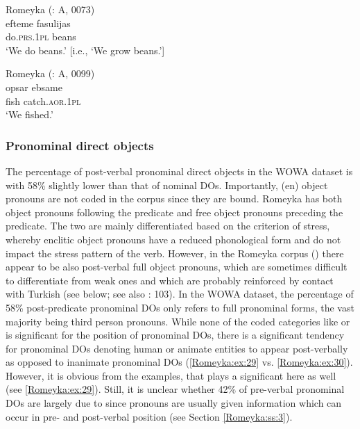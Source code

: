 \documentclass[output=paper,colorlinks,citecolor=brown]{langscibook}
\begin{document}
\ea\label{Romeyka:ex:27}
Romeyka (\citealt{schreiber2021pontic}: A, 0073) \\
\gll efteme fasulijas \\
do\textsc{.prs.1pl} beans \\
\glt `We do beans.' [i.e., `We grow beans.']  \\
\z

\ea\label{Romeyka:ex:28} 	
Romeyka (\citealt{schreiber2021pontic}: A, 0099) \\
\gll opsar ebsame \\
fish catch\textsc{.aor.1pl} \\
\glt `We fished.'
\z

\subsubsection{Pronominal direct objects}\label{Romeyka:ss:4.4.2}

The percentage of post-verbal pronominal direct objects in the WOWA dataset is with 58\% slightly lower than that of nominal DOs. Importantly, (en) object pronouns are not coded in the corpus since they are bound. Romeyka has both  object pronouns following the predicate and free object pronouns preceding the predicate. The two are mainly differentiated based on the criterion of stress, whereby enclitic object pronouns have a reduced phonological form and do not impact the stress pattern of the verb. However, in the Romeyka corpus (\citealt{schreiber_inprep}) there appear to be also post-verbal full object pronouns, which are sometimes difficult to differentiate from weak ones and which are probably reinforced by contact with Turkish (see below; see also \citealt{schreibergrammar2022}: 103). In the WOWA dataset, the percentage of 58\% post-predicate pronominal DOs only refers to full pronominal forms, the vast majority being third person pronouns. While none of the coded categories like  or  is significant for the position of pronominal DOs, there is a significant tendency for pronominal DOs denoting human or animate entities to appear post-verbally as opposed to inanimate pronominal DOs (\ref{Romeyka:ex:29} vs. \ref{Romeyka:ex:30}). However, it is obvious from the examples, that  plays a significant  here as well (see \ref{Romeyka:ex:29}). Still, it is unclear whether 42\% of pre-verbal pronominal DOs are largely due to  since pronouns are usually given information which can occur in pre- and post-verbal position (see Section \ref{Romeyka:ss:3}).
\end{document}
